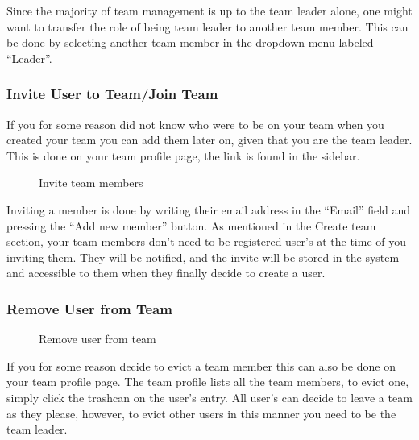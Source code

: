 Since the majority of team management is up to the team leader alone,
one might want to transfer the role of being team leader to another
team member. This can be done by selecting another team member in the
dropdown menu labeled {\textquotedblleft}Leader{\textquotedblright}.


\bigskip


\bigskip

\subsubsection{Invite User to Team/Join Team}

If you for some reason did not know who were to be on your team when you
created your team you can add them later on, given that you are the
team leader. This is done on your team profile page, the link is found
in the sidebar.

\begin{figure}
\centering
 \caption{Invite team members}
 \label{fig:teamInvite}
\end{figure}

Inviting a member is done by writing their email address in the
{\textquotedblleft}Email{\textquotedblright} field and pressing the
{\textquotedblleft}Add new member{\textquotedblright} button. As
mentioned in the Create team section, your team members
don{\textquoteright}t need to be registered user{\textquoteright}s at
the time of you inviting them. They will be notified, and the invite
will be stored in the system and accessible to them when they finally
decide to create a user. 

\subsubsection{Remove User from Team}

\begin{figure}
\centering
 \caption{Remove user from team}
 \label{fig:teamRemoveUser}
\end{figure}

If you for some reason decide to evict a team member this can also be
done on your team profile page. The team profile lists all the team
members, to evict one, simply click the trashcan on the
user{\textquoteright}s entry. All user{\textquoteright}s can decide to
leave a team as they please, however, to evict other users in this
manner you need to be the team leader.


